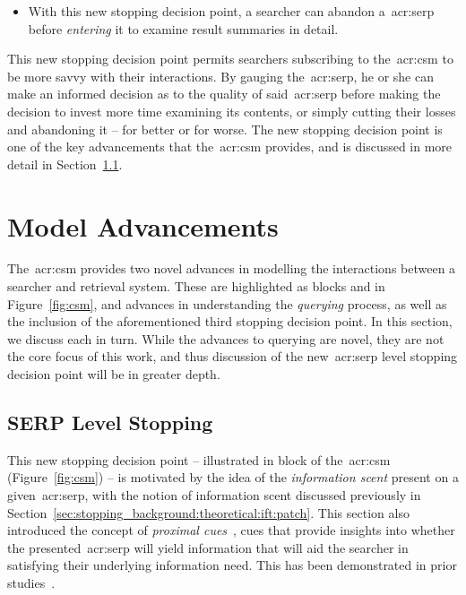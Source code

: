 \begin{itemize}
    \item[\blueboxbold{3}]{ With this new stopping decision point, a searcher can abandon a~\gls{acr:serp} before \emph{entering} it to examine result summaries in detail.}
\end{itemize}

This new stopping decision point permits searchers subscribing to the~\gls{acr:csm} to be more savvy with their interactions. By gauging the~\gls{acr:serp}, he or she can make an informed decision as to the quality of said~\gls{acr:serp} before making the decision to invest more time examining its contents, or simply cutting their losses and abandoning it -- for better or for worse. The new stopping decision point is one of the key advancements that the~\gls{acr:csm} provides, and is discussed in more detail in Section~\ref{sec:csm:advancements:stopping}.

\section{Model Advancements}\label{sec:csm:advancements}
The~\gls{acr:csm} provides two novel advances in modelling the interactions between a searcher and retrieval system. These are highlighted as blocks  and  in Figure~\ref{fig:csm}, and advances in understanding the \emph{querying} process, as well as the inclusion of the aforementioned third stopping decision point. In this section, we discuss each in turn. While the advances to querying are novel, they are not the core focus of this work, and thus discussion of the new~\gls{acr:serp} level stopping decision point will be in greater depth.

\subsection{SERP Level Stopping}\label{sec:csm:advancements:stopping}
This new stopping decision point -- illustrated in block  of the~\gls{acr:csm} (Figure~\ref{fig:csm}) -- is motivated by the idea of the \emph{information scent} present on a given~\gls{acr:serp}, with the notion of information scent discussed previously in Section~\ref{sec:stopping_background:theoretical:ift:patch}. This section also introduced the concept of \emph{proximal cues}~\citep{chi2001information_scent}, cues that provide insights into whether the presented~\gls{acr:serp} will yield information that will aid the searcher in satisfying their underlying information need. This has been demonstrated in prior studies~\citep{wu2014information_scent, ong2017scent_behaviour, maxwell2017snippets}.

